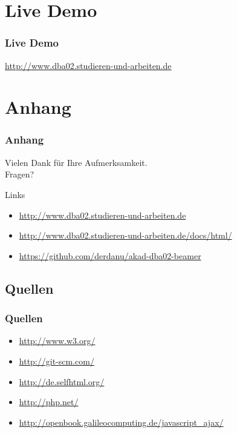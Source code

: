 \documentclass[xcolor=dvipsnames]{beamer}
\begin{document}
\section{Live Demo}
\begin{frame} %
  \frametitle{Live Demo} %
  \begin{center}  
      \Huge	\url{http://www.dba02.studieren-und-arbeiten.de}		
  \end{center}
\end{frame}


\section{Anhang}
\begin{frame}
  \frametitle{Anhang} %
	\begin{block}{}	
		\begin{center}
			Vielen Dank für Ihre Aufmerksamkeit. \\
			Fragen?
		\end{center}	
	\end{block}
	\begin{block}{Links}	
		\begin{itemize}
			\item \url{http://www.dba02.studieren-und-arbeiten.de}					
			\item \url{http://www.dba02.studieren-und-arbeiten.de/docs/html/}					
			\item \url{https://github.com/derdanu/akad-dba02-beamer}	
		\end{itemize}
	\end{block}
\end{frame}

\subsection{Quellen}
\begin{frame} %
  \frametitle{Quellen} %
 	\begin{itemize}
		\item \url{http://www.w3.org/}
		\item \url{http://git-scm.com/}
		\item \url{http://de.selfhtml.org/}
		\item \url{http://php.net/}
		\item \url{http://openbook.galileocomputing.de/javascript_ajax/}
	\end{itemize}
\end{frame}
\end{document}
